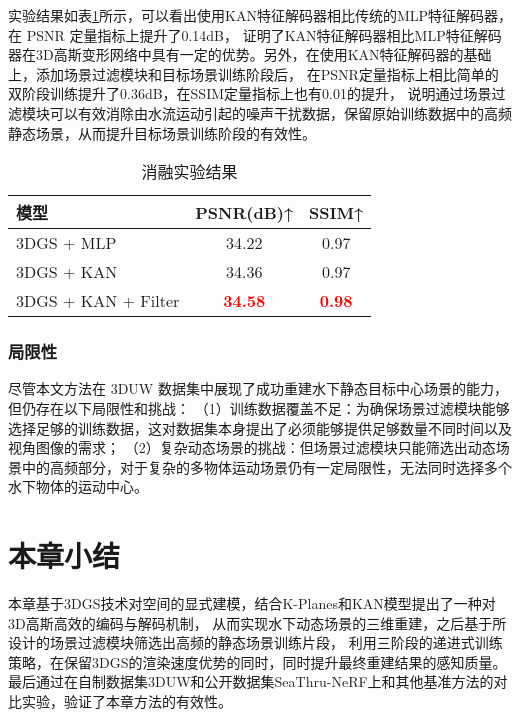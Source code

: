 实验结果如表\ref{tab:recon_ablation}所示，可以看出使用KAN特征解码器相比传统的MLP特征解码器，在 PSNR 定量指标上提升了0.14dB，
证明了KAN特征解码器相比MLP特征解码器在3D高斯变形网络中具有一定的优势。另外，在使用KAN特征解码器的基础上，添加场景过滤模块和目标场景训练阶段后，
在PSNR定量指标上相比简单的双阶段训练提升了0.36dB，在SSIM定量指标上也有0.01的提升，
说明通过场景过滤模块可以有效消除由水流运动引起的噪声干扰数据，保留原始训练数据中的高频静态场景，从而提升目标场景训练阶段的有效性。

\begin{table}
    \centering
    \caption{消融实验结果}
    \label{tab:recon_ablation}
    \begin{tabular}{lcc}
        \toprule
        模型 & PSNR(dB)↑ & SSIM↑ \\
        \midrule
        3DGS + MLP & 34.22 & 0.97 \\
        3DGS + KAN & 34.36 & 0.97\\
        3DGS + KAN + Filter & \textcolor{red}{\textbf{34.58}} & \textcolor{red}{\textbf{0.98}} \\
        \bottomrule
    \end{tabular}
\end{table}


\subsubsection{局限性}
尽管本文方法在 3DUW 数据集中展现了成功重建水下静态目标中心场景的能力，但仍存在以下局限性和挑战：
（1）训练数据覆盖不足：为确保场景过滤模块能够选择足够的训练数据，这对数据集本身提出了必须能够提供足够数量不同时间以及视角图像的需求；
（2）复杂动态场景的挑战：但场景过滤模块只能筛选出动态场景中的高频部分，对于复杂的多物体运动场景仍有一定局限性，无法同时选择多个水下物体的运动中心。

\section{本章小结}
本章基于3DGS技术对空间的显式建模，结合K-Planes和KAN模型提出了一种对3D高斯高效的编码与解码机制，
从而实现水下动态场景的三维重建，之后基于所设计的场景过滤模块筛选出高频的静态场景训练片段，
利用三阶段的递进式训练策略，在保留3DGS的渲染速度优势的同时，同时提升最终重建结果的感知质量。
最后通过在自制数据集3DUW和公开数据集SeaThru-NeRF上和其他基准方法的对比实验，验证了本章方法的有效性。


